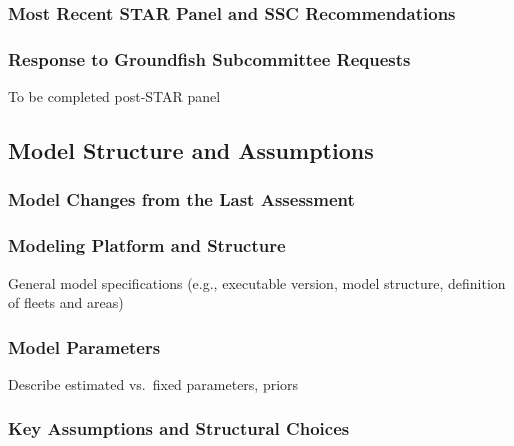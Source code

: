 \documentclass[11pt,
  english,
  letterpaper,
]{article}
\begin{document}
\hypertarget{most-recent-star-panel-and-ssc-recommendations}{%
\subsubsection{Most Recent STAR Panel and SSC Recommendations}\label{most-recent-star-panel-and-ssc-recommendations}}

\hypertarget{response-to-groundfish-subcommittee-requests}{%
\subsubsection{Response to Groundfish Subcommittee Requests}\label{response-to-groundfish-subcommittee-requests}}

To be completed post-STAR panel

\hypertarget{model-structure-and-assumptions}{%
\subsection{Model Structure and Assumptions}\label{model-structure-and-assumptions}}

\hypertarget{model-changes-from-the-last-assessment}{%
\subsubsection{Model Changes from the Last Assessment}\label{model-changes-from-the-last-assessment}}

\hypertarget{modeling-platform-and-structure}{%
\subsubsection{Modeling Platform and Structure}\label{modeling-platform-and-structure}}

General model specifications (e.g., executable version, model structure, definition of fleets and areas)

\hypertarget{model-parameters}{%
\subsubsection{Model Parameters}\label{model-parameters}}

Describe estimated vs.~fixed parameters, priors

\hypertarget{key-assumptions-and-structural-choices}{%
\subsubsection{Key Assumptions and Structural Choices}\label{key-assumptions-and-structural-choices}}
\end{document}
